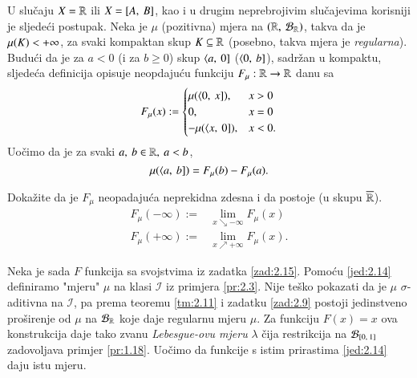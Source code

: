 U slu\v caju $X = \mathbb{R}$ ili $X = [{A}, \:{B}]$, kao i u drugim neprebrojivim slu\v cajevima korisniji je sljede\' ci postupak.
Neka je $\mu$ (pozitivna) mjera na $(\mathbb{R}, \: \mathcal{B}_{\mathbb{R}})$, takva da je $\mu({K}) < +\infty$, za svaki kompaktan skup $K \subseteq \mathbb{R}$ (posebno, takva mjera je \emph{regularna}).
Budu\' ci da je za $a < 0$ (i za $b \geq 0$) skup $\langle {a}, \: {0}]$ ($\langle {0}, \: {b}]$), sadr\v zan u kompaktu, sljede\' ca definicija opisuje neopdaju\' cu funkciju $F_{\mu}: \mathbb{R} \to \mathbb{R}$ danu sa
\begin{equation}    \label{jed:2.13}
    F_{\mu}(x) :=
        \begin{cases}
            \mu({\langle {0}, \: {x}]}), &x > 0\\
            0,   &x = 0\\
            - \mu({\langle {x}, \: {0}]}), &x < 0.
        \end{cases}
\end{equation}
Uo\v cimo da je za svaki $a, \: b \in \mathbb{R}, \: a < b$,
\begin{equation}    \label{jed:2.14}
    \mu({\langle {a}, \: {b}]}) = F_{\mu}(b) - F_{\mu}(a).
\end{equation}

\begin{zad} \label{zad:2.15}
    Doka\v zite da je $F_{\mu}$ neopadaju\' ca neprekidna zdesna i da postoje (u skupu $\overline{\mathbb{R}}$).
    \begin{align*}
        F_{\mu}(-\infty) :=& \lim_{x \searrow -\infty} F_{\mu}(x)\\
        F_{\mu}(+\infty) :=& \lim_{x \nearrow +\infty} F_{\mu}(x).
    \end{align*}
\end{zad}

Neka je sada $F$ funkcija sa svojstvima iz zadatka \ref{zad:2.15}.
Pomo\' cu \eqref{jed:2.14} definiramo "mjeru" $\mu$ na klasi $\mathcal{I}$ iz primjera \eqref{pr:2.3}.
Nije te\v sko pokazati da je $\mu$ $\sigma$-aditivna na $\mathcal{I}$, pa prema teoremu \ref{tm:2.11} i zadatku \ref{zad:2.9} postoji jedinstveno pro\v sirenje od $\mu$ na $\mathcal{B}_{\mathbb{R}}$ koje daje regularnu mjeru $\mu$.
Za funkciju $F(x) = x$ ova konstrukcija daje tako zvanu \emph{Lebesgue-ovu mjeru} $\lambda$ \v cija restrikcija na $\mathcal{B}_{[{0}, \:{1}]}$ zadovoljava primjer \ref{pr:1.18}.
Uo\v cimo da funkcije s istim prirastima \eqref{jed:2.14} daju istu mjeru.